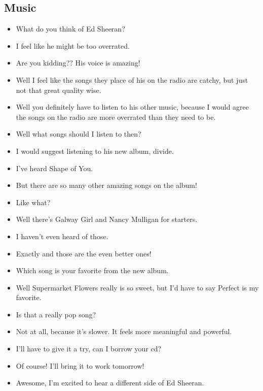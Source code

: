 \documentclass[11pt,a4paper]{article}
\begin{document}
\subsection{Music}\label{sec:ed_sheeran}
\begin{itemize}
\itemsep0em
\item[\ding{172}] What do you think of Ed Sheeran?
\item[\ding{173}] I feel like he might be too overrated.
\item[\ding{172}] Are you kidding?? His voice is amazing!
\item[\ding{173}] Well I feel like the songs they place of his on the radio are catchy, but just not that great quality wise.
\item[\ding{172}] Well you definitely have to listen to his other music, because I would agree the songs on the radio are more overrated than they need to be.
\item[\ding{173}] Well what songs should I listen to then?
\item[\ding{172}] I would suggest listening to his new album, divide.
\item[\ding{173}] I've heard Shape of You.
\item[\ding{172}] But there are so many other amazing songs on the album!
\item[\ding{173}] Like what?
\item[\ding{172}] Well there's Galway Girl and Nancy Mulligan for starters.
\item[\ding{173}] I haven't even heard of those.
\item[\ding{172}] Exactly and those are the even better ones!
\item[\ding{173}] Which song is your favorite from the new album.
\item[\ding{172}] Well Supermarket Flowers really is so sweet, but I'd have to say Perfect is my favorite.
\item[\ding{173}] Is that a really pop song?
\item[\ding{172}] Not at all, because it's slower.  It feels more meaningful and powerful.
\item[\ding{173}] I'll have to give it a try, can I borrow your cd?
\item[\ding{172}] Of course! I'll bring it to work tomorrow!
\item[\ding{173}] Awesome, I'm excited to hear a different side of Ed Sheeran.
\end{itemize}
\end{document}

